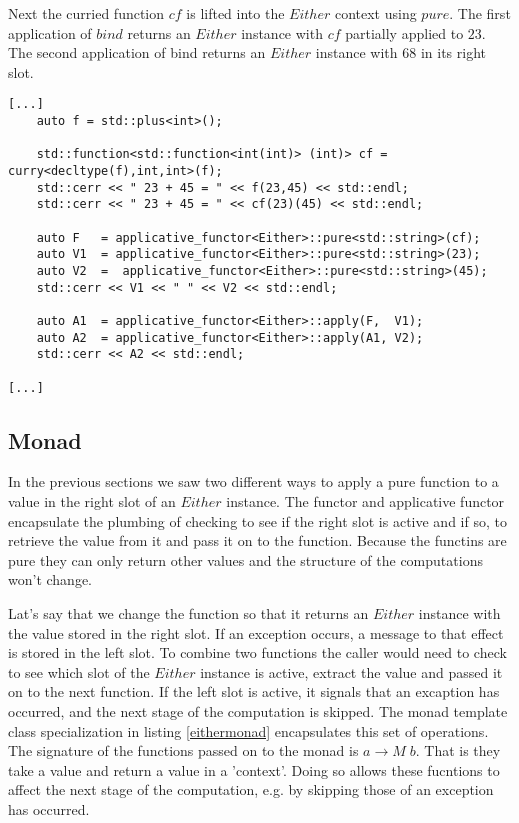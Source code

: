 \documentclass[12pt,fleqn]{article}
\begin{document}
Next the curried function $cf$ is lifted into the $Either$ context using $pure$.
The first application of $bind$ returns an $Either$ instance with $cf$ partially applied to $23$.
The second application of bind returns an $Either$ instance with $68$ in its right slot.


%
%
\begin{minipage}{\linewidth}
\begin{lstlisting}[caption=Either applicative, label=eitherappexamp]
[...]
    auto f = std::plus<int>();

	std::function<std::function<int(int)> (int)> cf = 	curry<decltype(f),int,int>(f);
	std::cerr << " 23 + 45 = " << f(23,45) << std::endl;
	std::cerr << " 23 + 45 = " << cf(23)(45) << std::endl;

	auto F   = applicative_functor<Either>::pure<std::string>(cf);
	auto V1  = applicative_functor<Either>::pure<std::string>(23);
	auto V2  =  applicative_functor<Either>::pure<std::string>(45);
	std::cerr << V1 << " " << V2 << std::endl;  
	
	auto A1  = applicative_functor<Either>::apply(F,  V1);
	auto A2  = applicative_functor<Either>::apply(A1, V2);
	std::cerr << A2 << std::endl;  

[...]
\end{lstlisting}
\end{minipage}
%
%
%

\subsection{Monad}
%

In the previous sections we saw two different ways to apply a pure function to a value in the right slot of an $Either$ instance.
The functor and applicative functor encapsulate the plumbing of checking to see if the right slot is active and if so, to retrieve
the value from it and pass it on to the function.
Because the functins are pure they can only return other values and the structure of the computations won't change.

Lat's say that we change the function so that it returns an $Either$ instance with the value stored in the right slot.
If an exception occurs, a message to that effect is stored in the left slot.
To combine two functions the caller would need to check to see which slot of the $Either$ instance is active, extract the value and passed it on to the next function.
If the left slot is active, it signals that an excaption has occurred, and the next stage of the computation is skipped.
The monad template class specialization in listing \ref{eithermonad} encapsulates this set of operations.
The signature of the functions passed on to the monad is $ a \rightarrow M \; b$. That is they take a value and return a value in a 'context'.
Doing so allows these fucntions to affect the next stage of the computation, e.g. by skipping those of an exception has occurred.
\end{document}
